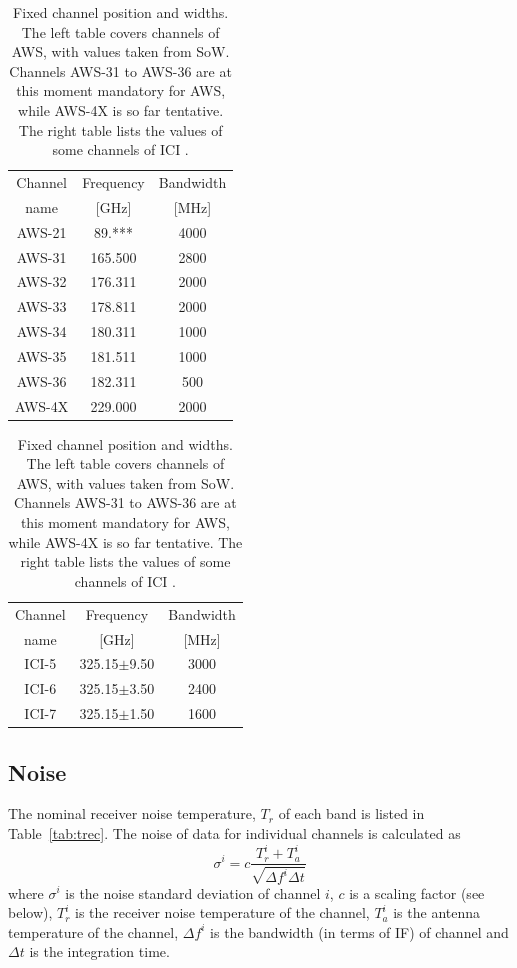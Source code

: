 \documentclass[12pt]{article}
\begin{document}
\begin{table}[!b]
  \begin{minipage}[b]{0.5\linewidth}
  \centering  
  \begin{tabular}[c]{c|c|c}
    Channel & Frequency   & Bandwidth \\
    name    & [GHz] &  [MHz] \\
    \hline
    AWS-21  &  89.*** & 4000\\
    AWS-31  & 165.500 & 2800\\
    AWS-32  & 176.311 & 2000\\
    AWS-33  & 178.811 & 2000\\
    AWS-34  & 180.311 & 1000\\
    AWS-35  & 181.511 & 1000\\
    AWS-36  & 182.311 & \phantom{0}500\\
    AWS-4X  & 229.000 & 2000\\
    \hline
  \end{tabular}
  \end{minipage}%
  \begin{minipage}[b]{0.5\linewidth}
  \centering  
  \begin{tabular}[c]{c|c|c}
    Channel & Frequency   & Bandwidth \\
    name    & [GHz] &  [MHz] \\
    \hline
    ICI-5  & 325.15$\pm$9.50 & 3000\\
    ICI-6  & 325.15$\pm$3.50 & 2400\\
    ICI-7  & 325.15$\pm$1.50 & 1600\\
    \hline
  \end{tabular}
  \end{minipage}  
  \caption{Fixed channel position and widths. The left table covers channels of
    AWS, with values taken from SoW. Channels AWS-31 to AWS-36 are at this
    moment mandatory for AWS, while AWS-4X is so far tentative. The right table
    lists the values of some channels of ICI \citep{eriksson:towar:20}.}
  \label{tab:fixed:chs}
\end{table}


\subsection{Noise}
%
The nominal receiver noise temperature, $T_r$ of each band is listed in
Table~\ref{tab:trec}. The noise of data for individual channels is calculated
as
\begin{equation}
  \sigma^i = c \frac{T^i_r+T^i_a}{\sqrt{\Delta\!f^i\Delta t}}
  \label{eq:noise}
\end{equation}
where $\sigma^i$ is the noise standard deviation of channel $i$, $c$ is a
scaling factor (see below), $T^i_r$ is the receiver noise temperature of the
channel, $T^i_a$ is the antenna temperature of the channel, $\Delta\!f^i$ is
the bandwidth (in terms of IF) of channel and $\Delta t$ is the integration
time.
\end{document}

